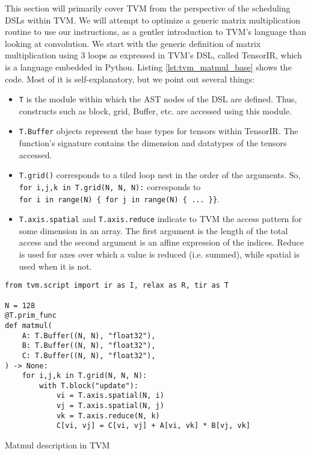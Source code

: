 \documentclass[acmsmall, nonacm=true]{acmart}
\begin{document}
This section will primarily cover TVM from the perspective of the scheduling DSLs within TVM. We will attempt to optimize a generic matrix multiplication routine to use our instructions, as a gentler introduction to TVM's language than looking at convolution. We start with the generic definition of matrix multiplication using 3 loops as expressed in TVM's DSL, called TensorIR, which is a language embedded in Python. Listing \ref{lst:tvm_matmul_base} shows the code. Most of it is self-explanatory, but we point out several things:

\begin{itemize}
\item \verb|T| is the module within which the AST nodes of the DSL are defined. Thus, constructs such as block, grid, Buffer, etc. are accessed using this module.
\item \verb|T.Buffer| objects represent the base types for tensors within TensorIR. The function's signature contains the dimension and datatypes of the tensors accessed.
\item \verb|T.grid()| corresponds to a tiled loop nest in the order of the arguments. So, \verb|for i,j,k in T.grid(N, N, N):| corresponds to\\ \verb|for i in range(N) { for j in range(N) { ... }}|.
\item \verb|T.axis.spatial| and \verb|T.axis.reduce| indicate to TVM the access pattern for some dimension in an array. The first argument is the length of the total access and the second argument is an affine expression of the indices. Reduce is used for axes over which a value is reduced (i.e. summed), while spatial is used when it is not. 
\end{itemize}


\begin{listing}
    \centering
    \begin{verbatim}
from tvm.script import ir as I, relax as R, tir as T

N = 128
@T.prim_func
def matmul(
    A: T.Buffer((N, N), "float32"),
    B: T.Buffer((N, N), "float32"),
    C: T.Buffer((N, N), "float32"),
) -> None:
    for i,j,k in T.grid(N, N, N):
        with T.block("update"):
            vi = T.axis.spatial(N, i)
            vj = T.axis.spatial(N, j)
            vk = T.axis.reduce(N, k)
            C[vi, vj] = C[vi, vj] + A[vi, vk] * B[vj, vk]
    \end{verbatim}
    \caption{Matmul description in TVM}
    \label{lst:tvm_matmul_base}
\end{listing}
\end{document}
